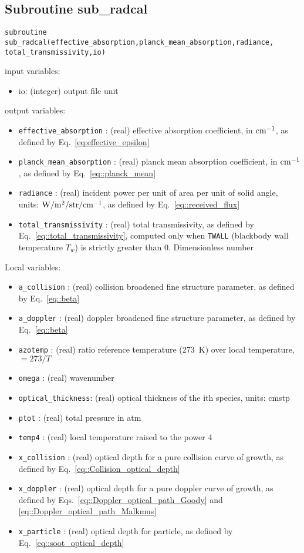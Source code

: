 \subsection{Subroutine sub\_radcal}
\label{sub:sub_radcal}
\begin{lstlisting}
subroutine sub_radcal(effective_absorption,planck_mean_absorption,radiance,
total_transmissivity,io)
\end{lstlisting}
input variables:
\begin{itemize}
 \item io: (integer) output file unit
\end{itemize}
output variables:
\begin{itemize}
 \item \verb=effective_absorption=   : (real) effective absorption coefficient, in $\rm cm^{-1}$, as defined by Eq.~\ref{eq:effective_epsilon}
 \item \verb=planck_mean_absorption= : (real) planck mean absorption coefficient, in $\rm cm^{-1}$, as defined by Eq.~\ref{eq::planck_mean}
 \item \verb=radiance=               : (real) incident power per unit of area per                                  unit of solid angle, units: $\rm W/m^{2}/str/cm^{-1}$, as defined by Eq.~\ref{eq::received_flux}
 \item \verb=total_transmissivity=   : (real) total transmissivity, as defined by Eq.~\ref{eq::total_transmissivity}, computed only when \verb=TWALL= (blackbody wall temperature $T_{w}$) is strictly greater than 0. Dimensionless number
\end{itemize}
Local variables:
\begin{itemize}
 \item \verb=a_collision= : (real) collision broadened fine structure parameter, as defined by Eq.~\ref{eq::beta}
 \item \verb=a_doppler=   : (real) doppler broadened fine structure parameter, as defined by Eq.~\ref{eq::beta}
 \item \verb=azotemp=     : (real) ratio reference temperature (273~K) over local temperature, $= 273/T$
 \item \verb=omega=       : (real) wavenumber
 \item \verb=optical_thickness=: (real) optical thickness of the ith species,  units: cmstp
 \item \verb=ptot=        : (real) total pressure in atm
 \item \verb=temp4=       : (real) local temperature raised to the power 4
 \item \verb=x_collision= : (real) optical depth for a pure collision curve of growth, as defined by Eq.~\ref{eq::Collision_optical_depth}
 \item \verb=x_doppler=   : (real) optical depth for a pure doppler curve of growth, as defined by Eqs.~\ref{eq::Doppler_optical_path_Goody} and \ref{eq::Doppler_optical_path_Malkmus}
 \item \verb=x_particle=  : (real) optical depth for particle, as defined by Eq.~\ref{eq::soot_optical_depth}
\end{itemize}
